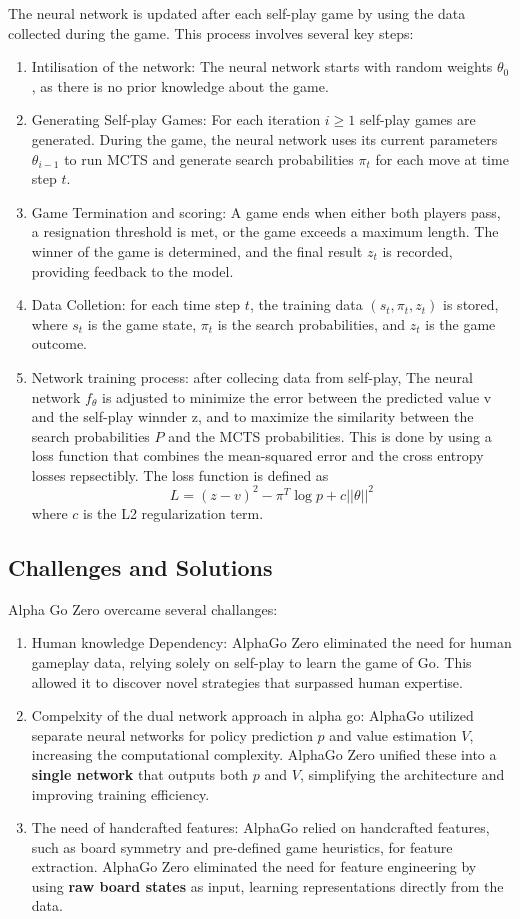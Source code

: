 The neural network is updated after each self-play game by using the data collected during the game. This process involves several key steps:
\begin{enumerate}
    \item Intilisation of the network: The neural network starts with random weights $\theta_0$, as there is no prior knowledge about the game.
    \item Generating Self-play Games: For each iteration $i \geq 1$ self-play games are generated. During the game, the neural network uses its current parameters $\theta_{i - 1}$ to run MCTS and generate search probabilities $\pi_t$ for each move at time step $t$.
    \item Game Termination and scoring: A game ends when either both players pass, a resignation threshold is met, or the game exceeds a maximum length. The winner of the game is determined, and the final result $z_t$ is recorded, providing feedback to the model.
    \item Data Colletion: for each time step $t$, the training data $(s_t, \pi_t, z_t)$ is stored, where $s_t$ is the game state, $\pi_t$ is the search probabilities, and $z_t$ is the game outcome.
    \item Network training process: after collecing data from self-play, The neural network $f_\theta$ is adjusted to minimize the error between the predicted value v and the self-play winnder z, and to maximize the similarity between the search probabilities $P$ and the MCTS probabilities.
    This is done by using a loss function that combines the mean-squared error and the cross entropy losses repsectibly. The loss function is defined as \[ L = (z - v)^2 - \pi^T \log p + c||\theta||^2\] where $c$ is the L2 regularization term.

\end{enumerate}

\subsection{Challenges and Solutions}
Alpha Go Zero overcame several challanges:
\begin{enumerate}
    \item Human knowledge Dependency: AlphaGo Zero eliminated the need for human gameplay data, relying solely on self-play to learn the game of Go. This allowed it to discover novel strategies that surpassed human expertise.
    \item Compelxity of the dual network approach in alpha go: AlphaGo utilized separate neural networks for policy prediction $p$ and value estimation $V$, increasing the computational complexity. AlphaGo Zero unified these into a \textbf{single network} that outputs both $p$ and $V$, simplifying the architecture and improving training efficiency.
    \item The need of handcrafted features: AlphaGo relied on handcrafted features, such as board symmetry and pre-defined game heuristics, for feature extraction. AlphaGo Zero eliminated the need for feature engineering by using \textbf{raw board states} as input, learning representations directly from the data.
\end{enumerate}

